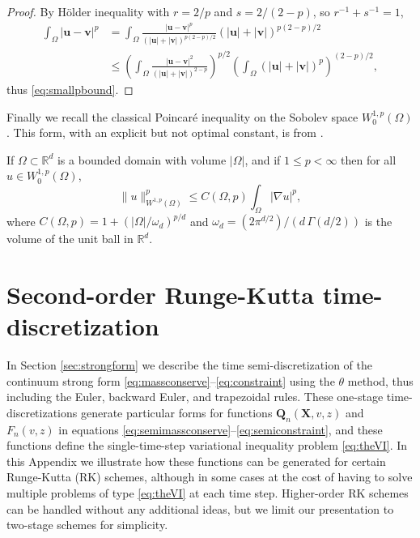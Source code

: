 \documentclass[final,leqno,onefignum,onetabnum]{siamltex1213bueler}
\newcommand\bu{\mathbf{u}}
\newcommand\bv{\mathbf{v}}
\newcommand\bQ{\mathbf{Q}}
\newcommand\bX{\mathbf{X}}
\renewcommand{\grad}{\nabla}
\newcommand\RR{\mathbb{R}}
\begin{document}
\begin{proof}  By H\"older inequality with $r=2/p$ and $s=2/(2-p)$, so $r^{-1}+s^{-1}=1$,
\begin{align*}
\int_\Omega |\bu - \bv|^p &= \int_\Omega \frac{|\bu-\bv|^p}{\left(|\bu|+|\bv|\right)^{p(2-p)/2}} \left(|\bu|+|\bv|\right)^{p(2-p)/2} \\
    &\le \left(\int_\Omega \frac{|\bu-\bv|^2}{\left(|\bu|+|\bv|\right)^{2-p}}\right)^{p/2} \left(\int_\Omega \left(|\bu|+|\bv|\right)^p\right)^{(2-p)/2},
\end{align*}
thus \eqref{eq:smallpbound}.
\end{proof}

Finally we recall the classical Poincar\'e inequality on the Sobolev space $W_0^{1,p}(\Omega)$.  This form, with an explicit but not optimal constant, is from \cite[section 7.8]{GilbargTrudinger2001}.

\begin{lemma} \label{lem:poincare}  If $\Omega\subset \RR^d$ is a bounded domain with volume $|\Omega|$, and if $1\le p<\infty$ then for all $u\in W_0^{1,p}(\Omega)$,
\begin{equation}
  \|u\|_{W^{1,p}(\Omega)}^p \le C(\Omega,p) \int_\Omega |\grad u|^p, \label{eq:poincare}
\end{equation}
where $C(\Omega,p)=1+(|\Omega|/\omega_d)^{p/d}$ and $\omega_d=(2 \pi^{d/2})/(d\,\Gamma(d/2))$ is the volume of the unit ball in $\RR^d$.
\end{lemma}


\section{Second-order Runge-Kutta time-discretization}   \label{app:rk2}  In Section \ref{sec:strongform} we describe the time semi-discretization of the continuum strong form \eqref{eq:massconserve}--\eqref{eq:constraint} using the $\theta$ method, thus including the Euler, backward Euler, and trapezoidal rules.  These one-stage time-discretizations generate particular forms for functions $\bQ_n(\bX,v,z)$ and $F_n(v,z)$ in equations \eqref{eq:semimassconserve}--\eqref{eq:semiconstraint}, and these functions define the single-time-step variational inequality problem \eqref{eq:theVI}.  In this Appendix we illustrate how these functions can be generated for certain Runge-Kutta (RK) schemes, although in some cases at the cost of having to solve multiple problems of type \eqref{eq:theVI} at each time step.  Higher-order RK schemes can be handled without any additional ideas, but we limit our presentation to two-stage schemes for simplicity.
\end{document}
